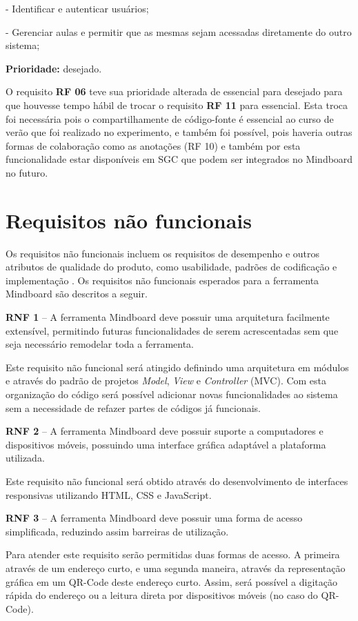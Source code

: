 - Identificar e autenticar usuários;

- Gerenciar aulas e permitir que as mesmas sejam acessadas diretamente do outro sistema;

\textbf{Prioridade:} desejado.

O requisito \textbf{RF 06} teve sua prioridade alterada de essencial para desejado para que houvesse tempo hábil de trocar o requisito \textbf{RF 11} para essencial. Esta troca foi necessária pois o compartilhamente de código-fonte é essencial ao curso de verão que foi realizado no experimento, e também foi possível, pois haveria outras formas de colaboração como as anotações (RF 10)  e também por esta funcionalidade estar disponíveis em SGC que podem ser integrados no Mindboard no futuro.

\section{Requisitos não funcionais}

Os requisitos não funcionais incluem os requisitos de desempenho e outros atributos de qualidade do produto, como usabilidade, padrões de codificação e implementação \cite{padua05}. Os requisitos não funcionais esperados para a ferramenta Mindboard são descritos a seguir.

\textbf{RNF 1} – A ferramenta Mindboard deve possuir uma arquitetura facilmente extensível, permitindo futuras funcionalidades de serem acrescentadas sem que seja necessário remodelar toda a ferramenta.

Este requisito não funcional será atingido definindo uma arquitetura em módulos e através do padrão de projetos \emph{Model}, \emph{View} e \emph{Controller} (MVC). Com esta organização do código será possível adicionar novas funcionalidades ao sistema sem a necessidade de refazer partes de códigos já funcionais.


\textbf{RNF 2} – A ferramenta Mindboard deve possuir suporte a computadores e dispositivos móveis, possuindo uma interface gráfica adaptável a plataforma utilizada.

Este requisito não funcional será obtido através do desenvolvimento de interfaces responsivas utilizando HTML, CSS e JavaScript.

\textbf{RNF 3} – A ferramenta Mindboard deve possuir uma forma de acesso simplificada, reduzindo assim barreiras de utilização. 

Para atender este requisito serão permitidas duas formas de acesso. A primeira através de um endereço curto, e uma segunda maneira, através da representação gráfica em um QR-Code deste endereço curto. Assim, será possível a digitação rápida do endereço ou a leitura direta por dispositivos móveis (no caso do QR-Code).

